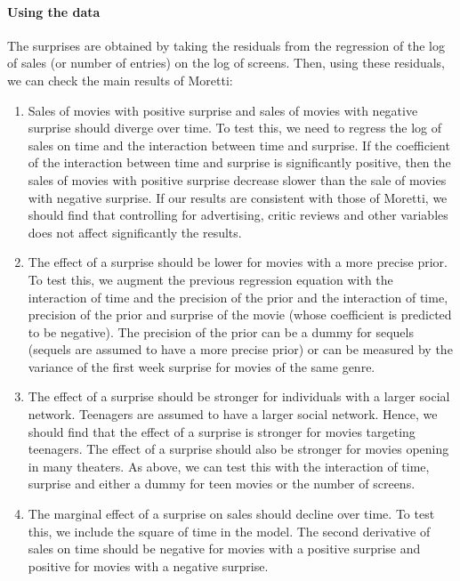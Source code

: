 \documentclass{article}
\begin{document}
\paragraph{Using the data} The surprises are obtained by taking the residuals from the regression of the log of sales (or number of entries) on the log of screens. Then, using these residuals, we can check the main results of Moretti:
\begin{enumerate}
	\item Sales of movies with positive surprise and sales of movies with negative surprise should diverge over time. To test this, we need to regress the log of sales on time and the interaction between time and surprise. If the coefficient of the interaction between time and surprise is significantly positive, then the sales of movies with positive surprise decrease slower than the sale of movies with negative surprise. If our results are consistent with those of Moretti, we should find that controlling for advertising, critic reviews and other variables does not affect significantly the results.
	\item The effect of a surprise should be lower for movies with a more precise prior. To test this, we augment the previous regression equation with the interaction of time and the precision of the prior and the interaction of time, precision of the prior and surprise of the movie (whose coefficient is predicted to be negative). The precision of the prior can be a dummy for sequels (sequels are assumed to have a more precise prior) or can be measured by the variance of the first week surprise for movies of the same genre.
	\item The effect of a surprise should be stronger for individuals with a larger social network. Teenagers are assumed to have a larger social network. Hence, we should find that the effect of a surprise is stronger for movies targeting teenagers. The effect of a surprise should also be stronger for movies opening in many theaters. As above, we can test this with the interaction of time, surprise and either a dummy for teen movies or the number of screens.
	\item The marginal effect of a surprise on sales should decline over time. To test this, we include the square of time in the model. The second derivative of sales on time should be negative for movies with a positive surprise and positive for movies with a negative surprise.
\end{enumerate}
\end{document}

